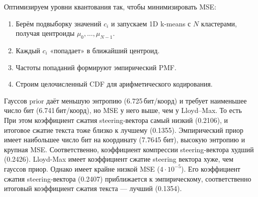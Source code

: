 \documentclass[a4paper,11pt]{article}
\begin{document}
Оптимизируем уровни квантования так, чтобы минимизировать MSE:
\begin{enumerate}
  \item Берём подвыборку значений $c_i$ и запускаем 1D k‑means с $N$ кластерами, получая центроиды $\mu_0,\dots,\mu_{N-1}$.
  \item Каждый $c_i$ «попадает» в ближайший центроид.
  \item Частоты попаданий формируют эмпирический PMF.
  \item Строим целочисленный CDF для арифметического кодирования.
\end{enumerate}

\begin{table}[ht]
\centering
{}
\caption{Сравнение hyper‑prior}
\end{table}

Гауссов prior даёт меньшую энтропию (6.725\,бит/коорд) и требует наименьшее число бит (6.741\,бит/коорд), но MSE у него выше, чем у Lloyd–Max. То есть  При этом коэффициент сжатия steering‑вектора самый низкий (0.2106), и итоговое сжатие текста тоже близко к лучшему (0.1355).
Эмпирический приор имеет наибольшее число бит на координату (7.7645 бит), высокую энтропию и крупная MSE. Соответственно, коэффициент компрессии steering‑вектора худший (0.2426).
Lloyd-Max имеет коэффициент сжатие steering вектора хуже, чем гауссов приор. Однако имеет крайне низкой MSE ($4\cdot 10^{-5}$). Его коэффициент сжатия steering‑вектора (0.2407) приближается к эмпирическому, соответственно итоговый коэффициент сжатия текста — лучший (0.1354).
\end{document}
